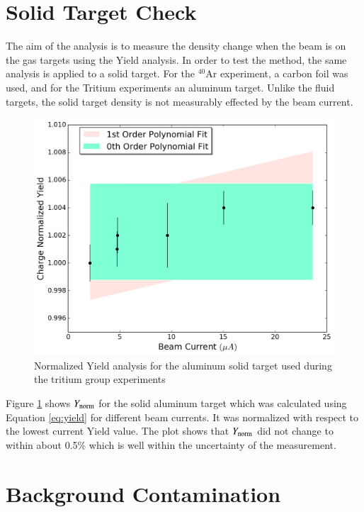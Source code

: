 \documentclass[final,5p,times,twocolumn]{elsarticle}
\begin{document}
\section{Solid Target Check}

The aim of the analysis is to measure the density change when the beam is on the gas targets using the Yield analysis. In order to test the method, the same analysis is applied to a solid target. For the $^{40}$Ar experiment, a carbon foil was used, and for the Tritium experiments an aluminum target. Unlike the fluid targets, the solid target density is not measurably effected by the beam current.

\begin{figure}[htbp]
    \centering
    \includegraphics[width=\linewidth]{images/solid_target.pdf}
    \caption{Normalized Yield analysis for the aluminum solid target used during the tritium group experiments}
    \label{fig:solid}
\end{figure}

Figure \ref{fig:solid} shows $Y_{\rm{norm}}$ for the solid aluminum target which was calculated using Equation \ref{eq:yield} for 
different beam currents. It was normalized with respect to the lowest current Yield value. The plot shows that  $Y_{\rm{norm}}$ 
did not change to within about 0.5$\%$ which is well within the uncertainty of the measurement. 

\section{Background Contamination}
\end{document}
